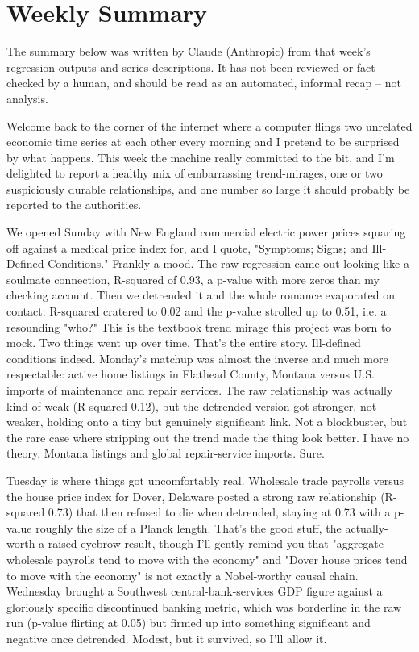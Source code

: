 \section{Weekly Summary}

\begin{tcolorbox}[colback=yellow!10,colframe=black!50,title=AI-Generated Content]
\noindent The summary below was written by Claude (Anthropic) from that week's regression outputs and series descriptions. It has not been reviewed or fact-checked by a human, and should be read as an automated, informal recap -- not analysis.
\end{tcolorbox}

Welcome back to the corner of the internet where a computer flings two unrelated economic time series at each other every morning and I pretend to be surprised by what happens. This week the machine really committed to the bit, and I'm delighted to report a healthy mix of embarrassing trend-mirages, one or two suspiciously durable relationships, and one number so large it should probably be reported to the authorities.

We opened Sunday with New England commercial electric power prices squaring off against a medical price index for, and I quote, "Symptoms; Signs; and Ill-Defined Conditions." Frankly a mood. The raw regression came out looking like a soulmate connection, R-squared of 0.93, a p-value with more zeros than my checking account. Then we detrended it and the whole romance evaporated on contact: R-squared cratered to 0.02 and the p-value strolled up to 0.51, i.e. a resounding "who?" This is the textbook trend mirage this project was born to mock. Two things went up over time. That's the entire story. Ill-defined conditions indeed. Monday's matchup was almost the inverse and much more respectable: active home listings in Flathead County, Montana versus U.S. imports of maintenance and repair services. The raw relationship was actually kind of weak (R-squared 0.12), but the detrended version got stronger, not weaker, holding onto a tiny but genuinely significant link. Not a blockbuster, but the rare case where stripping out the trend made the thing look better. I have no theory. Montana listings and global repair-service imports. Sure.

Tuesday is where things got uncomfortably real. Wholesale trade payrolls versus the house price index for Dover, Delaware posted a strong raw relationship (R-squared 0.73) that then refused to die when detrended, staying at 0.73 with a p-value roughly the size of a Planck length. That's the good stuff, the actually-worth-a-raised-eyebrow result, though I'll gently remind you that "aggregate wholesale payrolls tend to move with the economy" and "Dover house prices tend to move with the economy" is not exactly a Nobel-worthy causal chain. Wednesday brought a Southwest central-bank-services GDP figure against a gloriously specific discontinued banking metric, which was borderline in the raw run (p-value flirting at 0.05) but firmed up into something significant and negative once detrended. Modest, but it survived, so I'll allow it.

